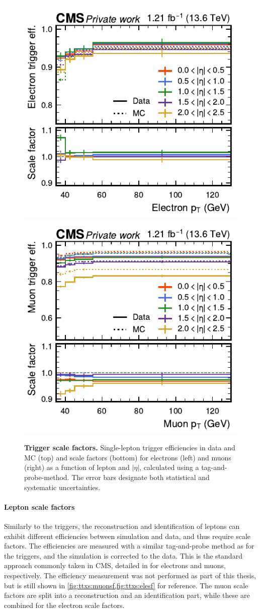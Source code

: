 \begin{figure}[t]
    \centering
    \includegraphics[width=0.49 \textwidth]{figures/ttxs/scalefactors/trigger_eff_e.pdf}
    \hfill
    \includegraphics[width=0.49 \textwidth]{figures/ttxs/scalefactors/trigger_eff_mu.pdf}
    \caption{\textbf{Trigger scale factors.} Single-lepton trigger efficiencies in data and MC (top) and scale factors (bottom) for electrons (left) and muons (right) as a function of lepton \pt and $|\eta|$, calculated using a tag-and-probe-method. The error bars designate both statistical and systematic uncertainties.}
    \label{fig:ttxs:triggersf}
\end{figure}

\paragraph{Lepton scale factors}

Similarly to the triggers, the reconstruction and identification of leptons can exhibit different efficiencies between simulation and data, and thus require scale factors. 
The efficiencies are measured with a similar tag-and-probe method as for the triggers, and the simulation is corrected to the data. This is the standard approach commonly taken in CMS, detailed in  for electrons and muons, respectively.%
The efficiency measurement was not performed as part of this thesis, but is still shown in \cref{fig:ttxs:muonsf,fig:ttxs:elesf} for reference. The muon scale factors are split into a reconstruction and an identification part, while these are combined for the electron scale factors.  

